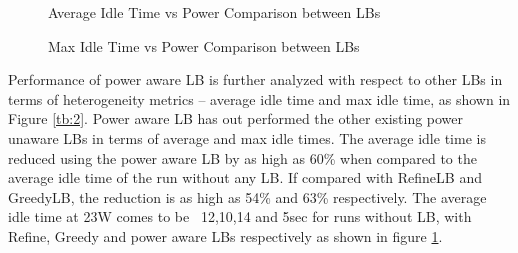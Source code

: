 \begin{figure}
\centering
\caption{Average Idle Time vs Power Comparison between LBs}
\label{fig:avg_times_final_vs_power}
\end{figure}

\begin{figure}
\centering
\caption{Max Idle Time vs Power Comparison between LBs}
\label{fig:idle_times_final_vs_power}
\end{figure}


Performance of power aware LB is further analyzed with respect to other LBs in
terms of heterogeneity metrics – average idle time and max idle time, as shown
in Figure \ref{tb:2}. Power aware LB has out performed the other existing power
unaware LBs in terms of average and max idle times. The average idle time is
reduced using the power aware LB by as high as 60\% when compared to the
average idle time of the run without any LB. If compared with RefineLB and
GreedyLB, the reduction is as high as 54\% and 63\% respectively. The average
idle time at 23W comes to be ~12,10,14 and 5sec for runs without LB, with
Refine, Greedy and power aware LBs respectively as shown in figure
\ref{fig:avg_times_final_vs_power}.

